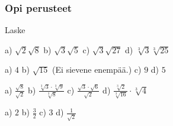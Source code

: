 \begin{tehtavasivu}

\subsubsection*{Opi perusteet}

Laske
\begin{tehtava}

\begin{vastaus}
\end{vastaus}
\end{tehtava}

\begin{tehtava}

\begin{vastaus}
\end{vastaus}
\end{tehtava}
	\begin{tehtava}

	\begin{vastaus}
	\end{vastaus}
\end{tehtava}

\begin{tehtava}
a) $\sqrt{2}\sqrt{8}$  \quad b)  $\sqrt{3}\sqrt{5}$ \quad c)  $\sqrt{3}\sqrt{27}$ \quad  d) $\sqrt[3]{3}\sqrt[3]{25} $
\begin{vastaus}
a) $4$ \quad b) $\sqrt{15}$ (Ei sievene enempää.)  \quad c) $9$ \quad d) $5$
\end{vastaus}
\end{tehtava}

\begin{tehtava} 
a) $ \frac{\sqrt{8}}{\sqrt{2}}$  \quad b)   $ \frac{\sqrt[3]{3} \cdot \sqrt[3]{9}}{\sqrt[3]{8}}$   \quad c)  $ \frac{\sqrt{3} \cdot \sqrt{6}}{\sqrt{2}}$ \quad d) $ \frac {\sqrt[3]{2}}{\sqrt[3]{16}} \cdot \sqrt[3]{4}$ 
\begin{vastaus}
a) $2$ \quad b) $\frac{3}{2}$  \quad c) $3$ \quad d) $\frac{1}{\sqrt{2}}$
\end{vastaus}
\end{tehtava}


\end{tehtavasivu}
